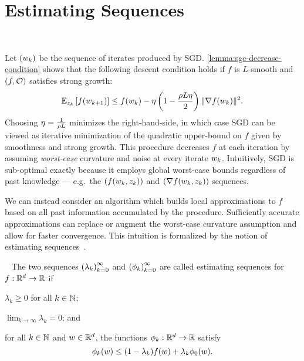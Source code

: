 \section{Estimating Sequences}~\label{sec:estimating-sequences}

Let \( \seq{\wk} \) be the sequence of iterates produced by \ac{SGD}.\@
\autoref{lemma:sgc-decrease-condition} shows that the following descent condition holds if \( f \) is \( L \)-smooth and \( \rbr{f, \oracle{}} \) satisfies strong growth:
\[ \Ek\sbr{f(\wkk)} \leq f(\wk) - \eta \rbr{1 - \frac{\sgc L \eta}{2}}\norm{\grad(\wk)}^2. \]
Choosing \( \eta = \frac{1}{\sgc L} \) minimizes the right-hand-side, in which case \ac{SGD} can be viewed as iterative minimization of the quadratic upper-bound on \( f \) given by smoothness and strong growth. 
This procedure decreases \( f \) at each iteration by assuming \emph{worst-case} curvature and noise at every iterate \( \wk \). 
Intuitively, \ac{SGD} is sub-optimal exactly because it employs global worst-case bounds regardless of past knowledge --- e.g.\ the \( \seq{f(\wk, \zk)} \) and \( \seq{\grad(\wk, \zk)} \) sequences. 

We can instead consider an algorithm which builds local approximations to \( f \) based on all past information accumulated by the procedure.
Sufficiently accurate approximations can replace or augment the worst-case curvature assumption and allow for faster convergence. 
This intuition is formalized by the notion of estimating sequences~\citep{nesterov2004lectures}.

\begin{definition}~\label{def:estimating_sequences}
    The two sequences \( \seq{\lambda_k}_{k=0}^\infty \) and \( \seq{\phi_k}_{k=0}^\infty \) are called estimating sequences for \( f : \R^d \rightarrow \R \) if
    \begin{inparaenum}[(i)]
        \item \( \lambda_k \geq 0 \) for all \( k \in \bbN \);
        \item \( \lim_{k\rightarrow \infty} \lambda_k = 0 \); and
        \item for all \( k \in \bbN \) and \( \w \in \R^d \), the functions \( \phi_k: \R^d \rightarrow \R \) satisfy
        \[ \phi_k(\w) \leq (1 - \lambda_k) f(\w) + \lambda_k \phi_0(\w). \]
    \end{inparaenum}
\end{definition}

